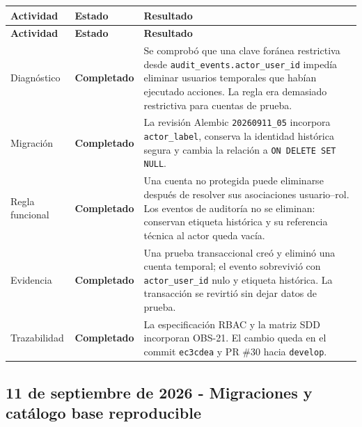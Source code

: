 \documentclass[11pt,letterpaper]{article}
\newcommand{\statusok}{\textcolor{deepgreen}{\textbf{Completado}}}
\newcommand{\file}[1]{\texttt{#1}}
\begin{document}
\begin{longtable}{@{}p{}p{}p{}@{}}
  \toprule
  \textbf{Actividad} & \textbf{Estado} & \textbf{Resultado} \\
  \midrule
  \endfirsthead
  \toprule
  \textbf{Actividad} & \textbf{Estado} & \textbf{Resultado} \\
  \midrule
  \endhead
  Diagnóstico & \statusok & Se comprobó que una clave foránea restrictiva desde \file{audit\_events.actor\_user\_id} impedía eliminar usuarios temporales que habían ejecutado acciones. La regla era demasiado restrictiva para cuentas de prueba. \\
  Migración & \statusok & La revisión Alembic \file{20260911\_05} incorpora \file{actor\_label}, conserva la identidad histórica segura y cambia la relación a \file{ON DELETE SET NULL}. \\
  Regla funcional & \statusok & Una cuenta no protegida puede eliminarse después de resolver sus asociaciones usuario--rol. Los eventos de auditoría no se eliminan: conservan etiqueta histórica y su referencia técnica al actor queda vacía. \\
  Evidencia & \statusok & Una prueba transaccional creó y eliminó una cuenta temporal; el evento sobrevivió con \file{actor\_user\_id} nulo y etiqueta histórica. La transacción se revirtió sin dejar datos de prueba. \\
  Trazabilidad & \statusok & La especificación RBAC y la matriz SDD incorporan OBS-21. El cambio queda en el commit \file{ec3cdea} y PR \#30 hacia \file{develop}. \\
  \bottomrule
\end{longtable}

\clearpage
\subsection{11 de septiembre de 2026 - Migraciones y catálogo base reproducible}
\end{document}
